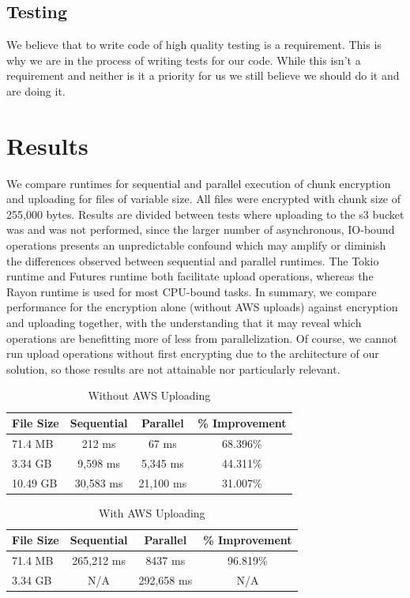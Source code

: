 \documentclass[conference]{IEEEtran}
\begin{document}
\subsection{Testing}

We believe that to write code of high quality testing is a requirement.
This is why we are in the process of writing tests for our code.
While this isn't a requirement and neither is it a priority for us we still believe we should do it and are doing it.

\section{Results}
We compare runtimes for sequential and parallel execution of chunk encryption and uploading for files of variable size.
All files were encrypted with chunk size of 255,000 bytes. Results are divided between tests where uploading to the s3 bucket 
was and was not performed, since the larger number of asynchronous, IO-bound operations presents an unpredictable confound 
which may amplify or diminish the differences observed between sequential and parallel runtimes. 
The Tokio runtime and Futures runtime both facilitate upload operations, whereas the Rayon runtime is used for most CPU-bound 
tasks. In summary, we compare performance for the encryption alone (without AWS uploads) against encryption and uploading together, 
with the understanding
that it may reveal which operations are benefitting more of less from parallelization. Of course, we cannot run upload operations
without first encrypting due to the architecture of our solution, so those results are not attainable nor particularly relevant.

\begin{table}[ht]
\centering
\caption{Without AWS Uploading}
\begin{tabular}[t]{lccc}
\toprule
File Size&Sequential&Parallel&\% Improvement\\
\midrule
71.4 MB&212 ms&67 ms&68.396\%\\
3.34 GB&9,598 ms&5,345 ms&44.311\%\\
10.49 GB&30,583 ms&21,100 ms&31.007\%\\
\bottomrule
\end{tabular}
\end{table}%

\begin{table}[ht]
	\centering
	\caption{With AWS Uploading}
	\begin{tabular}[t]{lccc}
	\toprule
	File Size&Sequential&Parallel&\% Improvement\\
	\midrule
	71.4 MB&265,212 ms&8437 ms&96.819\%\\
	3.34 GB&N/A&292,658 ms&N/A\\
	\bottomrule
	\end{tabular}
\end{table}%
\end{document}
